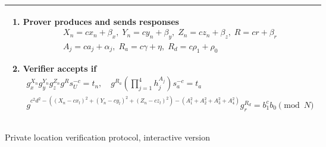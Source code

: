 \documentclass{article}
\begin{document}
\begin{figure}[!htb]
\begin{tabular}{|p{\linewidth}|}
\begin{enumerate}
\item
  Prover produces and sends responses
\begin{gather}
  X_n = c x_n + \beta_x,  \;
  Y_n = c y_n + \beta_y,  \;
  Z_n = c z_n + \beta_z,  \;
  R = c r + \beta_r   \\
  A_j = c a_j + \alpha_j, \;
  R_a = c \gamma + \eta,   \;
  R_d = c \rho_1 + \rho_0
\end{gather}
%
\item
  Verifier accepts if
\begin{gather}
\label{verf-linear}
  g_x^{X_n} g_y^{Y_n} g_z^{Z_n} g^{R} s_U^{-c} = t_n, \quad
  g^{R_a} (\prod_{j=1}^4 h_j^{A_j}) s_a^{-c} = t_a \\
\label{verf-distn}
  g^{c^2 d^2 - ((X_n - c x_l)^2 + (Y_n - c y_l)^2 + (Z_n - c z_l)^2) - (A_1^2 + A_2^2 + A_3^2 + A_4^2)} g_r^{R_d} = b_1^{c} b_0  \pmod{N}
\end{gather}
\end{enumerate}
\\
\hline
\end{tabular}
\caption{Private location verification protocol, interactive version}
\label{ip_fig}
\end{figure}
\end{document}
